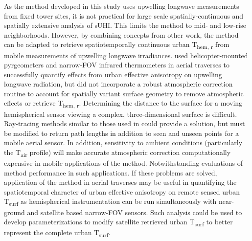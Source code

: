 \begin{bibunit}
As the method developed in this study uses upwelling longwave measurements from fixed tower sites, it is not practical for large scale spatially-continuous and spatially extensive analysis of sUHI. This limits the method to mid- and low-rise neighborhoods. However, by combining concepts from other work, the method can be adapted to retrieve spatiotemporally continuous urban T\textsubscript{hem, r} from mobile measurements of upwelling longwave irradiances. \citet{Sugawara2006} used helicopter-mounted pyrgeometers and narrow-FOV infrared thermometers in aerial traverses to successfully quantify effects from urban effective anisotropy on upwelling longwave radiation, but did not incorporate a robust atmospheric correction routine to account for spatially variant surface geometry to remove atmospheric effects or retrieve T\textsubscript{hem, r}. Determining the distance to the surface for a moving hemispherical sensor viewing a complex, three-dimensional surface is difficult. Ray-tracing methods similar to those used in \citet{Ceamanos2017} could provide a solution, but must be modified to return path lengths in addition to seen and unseen points for a mobile aerial sensor. In addition, sensitivity to ambient conditions (particularly the T\textsubscript{air} profile) will make accurate atmospheric correction computationally expensive in mobile applications of the method. Notwithstanding evaluations of method performance in such applications. If these problems are solved, application of the method in aerial traverses may be useful in quantifying the spatiotemporal character of urban effective anisotropy on remote sensed urban T\textsubscript{surf} as hemispherical instrumentation can be run simultaneously with near-ground and satellite based narrow-FOV sensors. Such analysis could be used to develop parameterizations to modify satellite retrieved urban T\textsubscript{surf} to better represent the complete urban T\textsubscript{surf}.


\end{bibunit}
